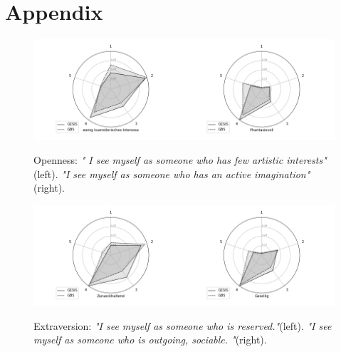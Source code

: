 \chapter*{Appendix}\label{Sec:Appendix}

                \begin{figure}[ht]
                \begin{center}
                   \includegraphics[scale=0.55,angle=0]{fig/Opennessfigure}
	         \label{Openness}
	         \caption{ Openness: \textit{" I see myself as someone who has few artistic interests"}(left). \textit{"I see myself as someone who has an active imagination"}(right).}
                \end{center}
                \end{figure}

                \begin{figure}[ht]
                \begin{center}
                   \includegraphics[scale=0.55,angle=0]{fig/Extraversionfigure}
	         \label{Extraversion}
	         \caption{Extraversion: \textit{"I see myself as someone who is reserved."}(left). \textit{"I see myself as someone who is outgoing, sociable. "}(right).}
                \end{center}
                \end{figure}


